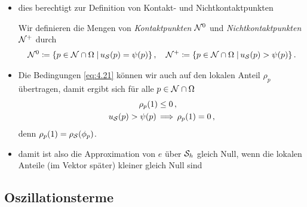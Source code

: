\begin{itemize}
\item dies berechtigt zur Definition von Kontakt- und Nichtkontaktpunkten
\begin{defi}
Wir definieren die Mengen von \textit{Kontaktpunkten} $\mathcal N^0$ und \textit{Nichtkontaktpunkten} $\mathcal N^+$ durch
\begin{align*}
	\mathcal N^0 \coloneqq  \{p \in \mathcal N \cap \Omega \;\vert\, u_{\mathcal S}(p) = \psi (p) \} \, , \quad 
	\mathcal N^+ \coloneqq  \{p \in \mathcal N \cap \Omega \;\vert\, u_{\mathcal S}(p) > \psi (p) \}\, .
\end{align*}
\end{defi}

\item 
\begin{bem}
Die Bedingungen \eqref{eq:4.21} können wir auch auf den lokalen Anteil $\rho_p$ übertragen, damit ergibt sich für alle $p \in \mathcal N \cap \Omega$
\begin{subequations}\label{eq:4.22}
\begin{align}\label{eq:4.22a}
	\rho_p(1) &  \le 0\, ,  \\
	\label{eq:4.22b}
	u_{\mathcal S} (p) > \psi (p) \, & \Longrightarrow \, \rho_p(1) =0 \, ,
\end{align}
\end{subequations}
denn $\rho_p (1) = \rho_{\mathcal S} (\phi_p)$.
\end{bem}

\item damit ist also die Approximation von $e$ über $\mathcal S_h$ gleich Null, wenn die lokalen Anteile (im Vektor später) kleiner gleich Null sind

\end{itemize}






\subsection{Oszillationsterme}
\label{kap:4.1.3}

